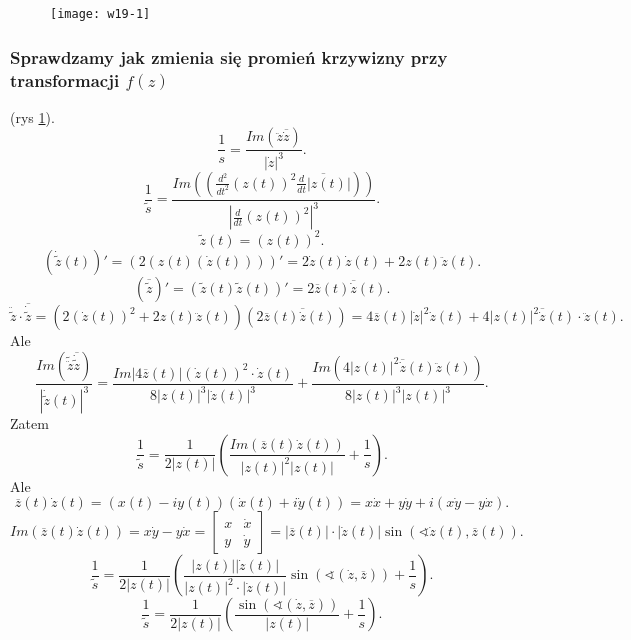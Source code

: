 \documentclass[../main.tex]{subfiles}
\begin{document}
     \begin{figure}[h]
        \centering
        \texttt{[image: w19-1]}
        \caption{}
        \label{fig:w19-1}
    \end{figure}
    \subsubsection{Sprawdzamy jak zmienia się promień krzywizny przy transformacji $f(z)$} (rys \ref{fig:w19-1}).
    \[
        \frac{1}{s} = \frac{Im(\ddot{z}\overline{\dot{z}})}{\left| \dot{z} \right| ^3}
    .\]
\[
    \frac{1}{\tilde s} = \frac{Im\left(\left(\frac{d^2}{dt^2}\left( z(t) \right) ^2 \overline{\frac{d}{dt}|z(t)|}\right)\right)}{\left| \frac{d}{dt}\left( z(t) \right) ^2 \right| ^3}
.\]
\[
    \tilde z (t) = \left( z(t) \right) ^2
.\]
\[
    \left( \dot{\tilde z}(t) \right)' = \left( 2\left(z(t)\left( \dot{z}(t) \right) \right) \right)' = 2 \dot{z}(t) \dot{z}(t) + 2z(t) \ddot{z}(t)
.\]
\[
    \left( \overline{\tilde z} \right)' = \left( \tilde z(t) \tilde z(t) \right)' = 2 \overline{z}(t) \overline{\dot{z}}(t)
.\]
\[
    \ddot{\tilde z} \cdot \overline{\dot{\tilde z}} = \left( 2(\dot{z}(t))^2 + 2z(t)\ddot{z}(t)\right)\left( 2\overline{z}(t)\overline{\dot{z}}(t) \right) = 4\overline{z}(t) \left| \dot{z} \right| ^2 \dot{z}(t) + 4\left| z(t) \right| ^2 \overline{\dot{z}}(t) \cdot \ddot{z}(t)
.\]
Ale
\[
    \frac{Im( \tilde \ddot{z} \overline{\dot{\tilde z}})}{\left| \dot{\tilde z}(t) \right|^3 } = \frac{Im\left| 4\overline{z}(t) \right| (\dot{z}(t))^2 \cdot \dot{z}(t)}{8\left| z(t) \right| ^3 \left| \dot{z}(t) \right| ^3} + \frac{Im(4 \left| z(t) \right| ^2 \overline{\dot{z}}(t) \ddot{z}(t))}{8\left| z(t) \right| ^3 \left| z(t) \right| ^3}
.\]
Zatem
\[
    \frac{1}{\tilde s} = \frac{1}{2\left| z(t) \right| }\left( \frac{Im\left( \overline{z}(t)\dot{z}(t) \right) }{\left| z(t) \right| ^2 \left| z(t) \right|} + \frac{1}{s} \right)
.\]
Ale
\[
    \overline{z}(t) \dot{z}(t) = \left( x(t) - iy(t) \right) \left( \dot{x}(t) + i\dot{y}(t) \right) = x\dot{x} + y\dot{y} + i\left( x\dot{y} - y\dot{x} \right)
.\]
\[
    Im\left( \overline{z}(t)\dot{z}(t) \right) = x\dot{y} - y\dot{x} = \begin{bmatrix} x&\dot{x}\\ y&\dot{y} \end{bmatrix} = \left| \overline{z}(t) \right|\cdot \left| \dot{z}(t) \right| \sin(\sphericalangle \dot{z}(t), \overline{z}(t))
.\]
\[
    \frac{1}{\tilde s} = \frac{1}{2\left| z(t) \right| }\left( \frac{\left| z(t) \right| \left| \dot{z}(t) \right| }{\left| z(t) \right| ^2 \cdot \left| \dot{z}(t) \right| } \sin(\sphericalangle(\dot{z}, \overline{z})) + \frac{1}{s}\right)
.\]
\[
    \frac{1}{\tilde s} = \frac{1}{2 \left| z(t) \right| } \left( \frac{\sin(\sphericalangle(\dot{z}, \overline{z}))}{\left| z(t) \right| } + \frac{1}{s} \right)
.\]
\end{document}
